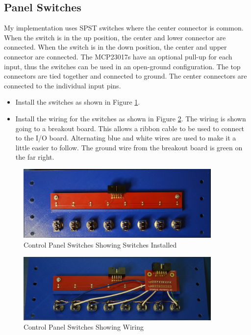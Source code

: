 \documentclass[10pt, openany]{book}
\begin{document}
\subsection{Panel Switches}
My implementation uses SPST switches where the center connector is common.  When the switch is in the up position, the center and lower connector are connected.  When the switch is in the down position, the center and upper connector are connected.  The MCP23017s have an optional pull-up for each input, thus the switches can be used in an open-ground configuration.  The top connectors are tied together and connected to ground.  The center connectors are connected to the individual input pins.
\begin{itemize}
  \item Install the switches as shown in Figure \ref{fig:SwitchInstalled}.
  \item Install the wiring for the switches as shown in Figure \ref{fig:SwitchWired}.  The wiring is shown going to a breakout board.  This allows a ribbon cable to be used to connect to the I/O board.  Alternating blue and white wires are used to make it a little easier to follow.  The ground wire from the breakout board is green on the far right.
\end{itemize}

\begin{figure}[ht!]
  \centering
  \includegraphics[width=0.9\textwidth]{../Pict/Switch-Installed.jpg}
  \caption{Control Panel Switches Showing Switches Installed}
  \label{fig:SwitchInstalled}
\end{figure}

\begin{figure}[ht!]
  \centering
  \includegraphics[width=0.9\textwidth]{../Pict/Switch-Wired.jpg}
  \caption{Control Panel Switches Showing Wiring}
  \label{fig:SwitchWired}
\end{figure}
\end{document}
